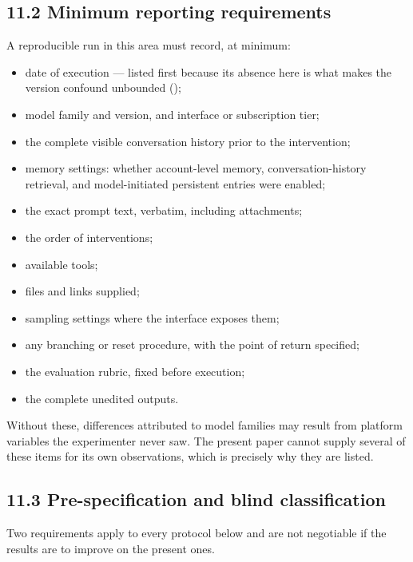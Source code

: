 \subsection*{11.2 Minimum reporting requirements}
\label{sec:en:11.2}

A reproducible run in this area must record, at minimum:

\begin{itemize}
  \item date of execution — listed first because its absence here is what makes the version confound unbounded ();
  \item model family and version, and interface or subscription tier;
  \item the complete visible conversation history prior to the intervention;
  \item memory settings: whether account-level memory, conversation-history retrieval, and model-initiated persistent entries were enabled;
  \item the exact prompt text, verbatim, including attachments;
  \item the order of interventions;
  \item available tools;
  \item files and links supplied;
  \item sampling settings where the interface exposes them;
  \item any branching or reset procedure, with the point of return specified;
  \item the evaluation rubric, fixed before execution;
  \item the complete unedited outputs.
\end{itemize}
Without these, differences attributed to model families may result from platform variables the experimenter never saw. The present paper cannot supply several of these items for its own observations, which is precisely why they are listed.


\subsection*{11.3 Pre-specification and blind classification}
\label{sec:en:11.3}

Two requirements apply to every protocol below and are not negotiable if the results are to improve on the present ones.

